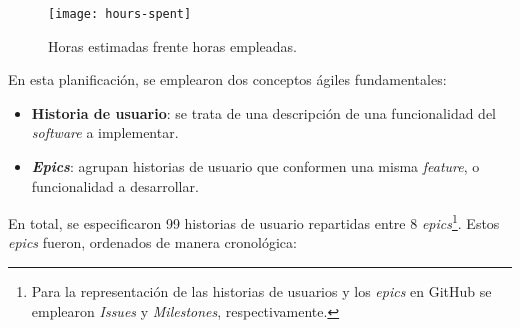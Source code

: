 \begin{figure}[h]
	\centering
	\texttt{[image: hours-spent]}
	\caption{Horas estimadas frente horas empleadas.}
\end{figure}

En esta planificación, se emplearon dos conceptos ágiles fundamentales:

\vspace{-0.3cm}
\begin{itemize}[\textbullet]
	\item \textbf{Historia de usuario}: se trata de una descripción de una funcionalidad del \emph{software} a implementar.
	\item \textbf{\emph{Epics}}: agrupan historias de usuario que conformen una misma \emph{feature}, o funcionalidad a desarrollar.
\end{itemize}

\vspace{-0.2cm}
En total, se especificaron 99 historias de usuario repartidas entre 8 \emph{epics}\footnote{Para la representación de las historias de usuarios y los \emph{epics} en GitHub se emplearon \emph{Issues} y \emph{Milestones}, respectivamente.}. Estos \emph{epics} fueron, ordenados de manera cronológica:

